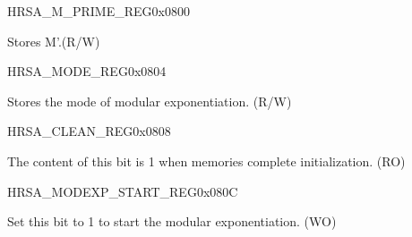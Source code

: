 

\begin{register}{H}{RSA\_M\_PRIME\_REG}{0x{}0800}\label{regdesc:RSAMPRIMEREG}
%
\regnewline%
\begin{regdesc}\begin{reglist}
\item [RSA\_M\_PRIME\_REG] Stores M'.(R/W)
\end{reglist}\end{regdesc}
\end{register}


\begin{register}{H}{RSA\_MODE\_REG}{0x{}0804}\label{regdesc:RSAMODEXPMODEREG}
%
%
\regnewline%
\begin{regdesc}\begin{reglist}
\item [RSA\_MODE] Stores the mode of modular exponentiation. (R/W)
\end{reglist}\end{regdesc}
\end{register}



\begin{register}{H}{RSA\_CLEAN\_REG}{0x{}0808}\label{regdesc:RSACLEANREG}
%
%
\regnewline%
\begin{regdesc}\begin{reglist}
\item [RSA\_CLEAN] The content of this bit is 1 when memories complete initialization. (RO)
\end{reglist}\end{regdesc}
\end{register}


\begin{register}{H}{RSA\_MODEXP\_START\_REG}{0x{}080C}\label{regdesc:RSAMODEXPSTARTREG}
%
%
\regnewline%
\begin{regdesc}\begin{reglist}
\item [RSA\_MODEXP\_START] Set this bit to 1 to start the modular exponentiation. (WO)
\end{reglist}\end{regdesc}
\end{register}


